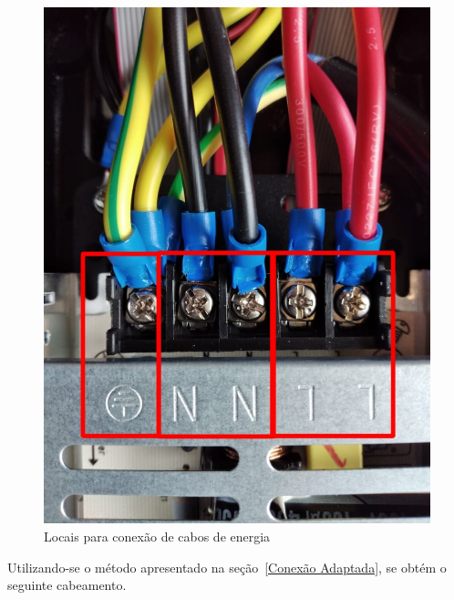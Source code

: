 \documentclass[12pt, a4paper]{article}
\begin{document}
\begin{figure}[!htb]
	\centering
	\includegraphics[width=.9\textwidth]{painel1Cp.jpeg}
	\caption{\label{fig:}Locais para conexão de cabos de energia}
\end{figure}

\newpage

Utilizando-se o método apresentado na seção~\ref{Conexão Adaptada}, se obtém o seguinte cabeamento.
\end{document}
